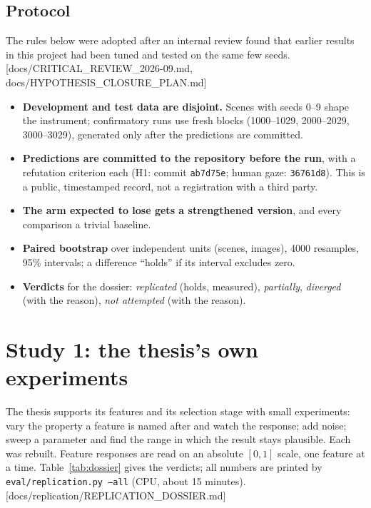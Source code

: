 \documentclass[11pt,a4paper]{article}
\newcommand{\src}[1]{\textcolor{blue!50!black}{\footnotesize\,[#1]}}
\newcommand{\src}[1]{}
\begin{document}
\subsection{Protocol}
\label{sec:protocol}
The rules below were adopted after an internal review found that earlier results
in this project had been tuned and tested on the same few seeds.
\src{docs/CRITICAL\_REVIEW\_2026-09.md, docs/HYPOTHESIS\_CLOSURE\_PLAN.md}
\begin{itemize}
  \item \textbf{Development and test data are disjoint.} Scenes with seeds 0--9
        shape the instrument; confirmatory runs use fresh blocks (1000--1029,
        2000--2029, 3000--3029), generated only after the predictions are
        committed.
  \item \textbf{Predictions are committed to the repository before the run},
        with a refutation criterion each (H1: commit \texttt{ab7d75e}; human
        gaze: \texttt{36761d8}). This is a public, timestamped record, not a
        registration with a third party.
  \item \textbf{The arm expected to lose gets a strengthened version}, and every
        comparison a trivial baseline.
  \item \textbf{Paired bootstrap} over independent units (scenes, images), 4000
        resamples, 95\% intervals; a difference ``holds'' if its interval
        excludes zero.
  \item \textbf{Verdicts} for the dossier: \emph{replicated} (holds, measured),
        \emph{partially}, \emph{diverged} (with the reason), \emph{not attempted}
        (with the reason).
\end{itemize}

\section{Study 1: the thesis's own experiments}
\label{sec:dossier}

The thesis supports its features and its selection stage with small experiments:
vary the property a feature is named after and watch the response; add noise;
sweep a parameter and find the range in which the result stays plausible. Each
was rebuilt. Feature responses are read on an absolute $[0,1]$ scale, one feature
at a time. Table~\ref{tab:dossier} gives the verdicts; all numbers are printed by
\texttt{eval/replication.py --all} (CPU, about 15 minutes).
\src{docs/replication/REPLICATION\_DOSSIER.md}
\end{document}
